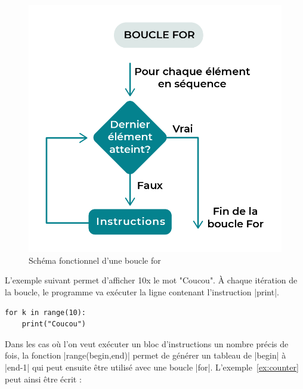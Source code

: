 \documentclass[11pt, a4paper]{book}
\begin{document}
\begin{figure}[h]\begin{center}
\includegraphics[scale=.3]{images/for-loop}
\caption{Schéma fonctionnel d'une boucle for}
\end{center}\end{figure}

\begin{example}
L'exemple suivant permet d'afficher 10x le mot "Coucou". À chaque itération de la boucle, le programme va exécuter la ligne contenant l'instruction |print|.
\end{example}

\begin{lstlisting}
for k in range(10):
    print("Coucou")
\end{lstlisting}


\begin{remarque}
Dans les cas où l'on veut exécuter un bloc d'instructions un nombre précis de fois, la fonction |range(begin,end)| permet de générer un tableau de |begin| à |end-1| qui peut ensuite être utilisé avec une boucle |for|. L'exemple~\ref{ex:counter} peut ainsi être écrit : 

\end{remarque}
\end{document}
